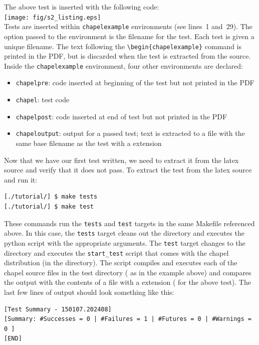   \begin{seamlessnote}
    The above test is inserted with the following \latex code: \\
    \texttt{[image: fig/s2\_listing.eps]}\\
    Tests are inserted within \verb|chapelexample| environments (see lines~1 and~29). The option
    passed to the environment is the filename for the test. Each test is given a unique filename.
    The text following the \verb|\begin{chapelexample}| command is printed in the PDF, but is 
      discarded when the test is extracted from the \latex source.  Inside the \verb|chapelexample|
      environment, four other environments are declared: 
      \begin{itemize}
        \item \verb|chapelpre|: code inserted at beginning of the test but not printed in the PDF
        \item \verb|chapel|: test code
        \item \verb|chapelpost|: code inserted at end of test but not printed in the PDF
        \item \verb|chapeloutput|:  output for a passed test; text is extracted to a file
          with the same base filename as the test with a  extension
      \end{itemize}

    Now that we have our first test written, we need to extract it from the latex source and verify
    that it does not pass.
    To extract the test from the latex source and run it:
    \begin{verbatim}
[./tutorial/] $ make tests
[./tutorial/] $ make test
    \end{verbatim}
    These commands run the \verb|tests| and \verb|test| targets in the same Makefile referenced above.
    In this case, the \verb|tests| target cleans out the  directory and
    executes the  python script with the appropriate arguments.
    The \verb|test| target changes to the  directory and 
    executes the \verb|start_test| script that comes with
    the chapel distribution (in the  directory). The script compiles 
      and executes each of the
    chapel source files in the test directory 
    (\eg {} as in the example above) 
    and compares the output with the contents of a file with a  extension
    (\eg {} for the above test). 
    The last few lines of output should look something like this:
    \begin{verbatim}
[Test Summary - 150107.202408]
[Summary: #Successes = 0 | #Failures = 1 | #Futures = 0 | #Warnings = 0 ]
[END]
    \end{verbatim}
  \end{seamlessnote}

